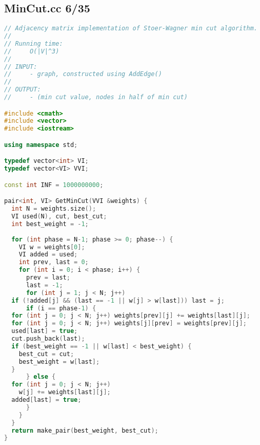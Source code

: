 \subsection{MinCut.cc 6/35}
\begin{lstlisting}[language=C++]
// Adjacency matrix implementation of Stoer-Wagner min cut algorithm.
//
// Running time:
//     O(|V|^3)
//
// INPUT: 
//     - graph, constructed using AddEdge()
//
// OUTPUT:
//     - (min cut value, nodes in half of min cut)

#include <cmath>
#include <vector>
#include <iostream>

using namespace std;

typedef vector<int> VI;
typedef vector<VI> VVI;

const int INF = 1000000000;

pair<int, VI> GetMinCut(VVI &weights) {
  int N = weights.size();
  VI used(N), cut, best_cut;
  int best_weight = -1;
  
  for (int phase = N-1; phase >= 0; phase--) {
    VI w = weights[0];
    VI added = used;
    int prev, last = 0;
    for (int i = 0; i < phase; i++) {
      prev = last;
      last = -1;
      for (int j = 1; j < N; j++)
  if (!added[j] && (last == -1 || w[j] > w[last])) last = j;
      if (i == phase-1) {
  for (int j = 0; j < N; j++) weights[prev][j] += weights[last][j];
  for (int j = 0; j < N; j++) weights[j][prev] = weights[prev][j];
  used[last] = true;
  cut.push_back(last);
  if (best_weight == -1 || w[last] < best_weight) {
    best_cut = cut;
    best_weight = w[last];
  }
      } else {
  for (int j = 0; j < N; j++)
    w[j] += weights[last][j];
  added[last] = true;
      }
    }
  }
  return make_pair(best_weight, best_cut);
}

\end{lstlisting}
